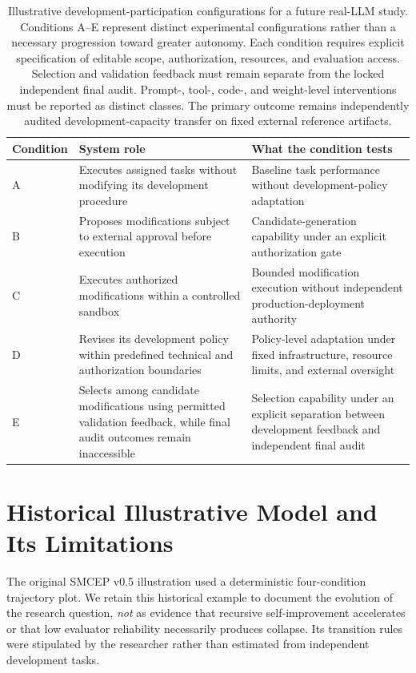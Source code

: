 \documentclass[11pt,a4paper]{article}
\begin{document}
\begin{table}[htbp]\centering\small
\begin{tabularx}{\linewidth}{@{}l X X@{}}\toprule
Condition & System role & What the condition tests \\\midrule
A & Executes assigned tasks without modifying its development procedure & Baseline task performance without development-policy adaptation \\
B & Proposes modifications subject to external approval before execution & Candidate-generation capability under an explicit authorization gate \\
C & Executes authorized modifications within a controlled sandbox & Bounded modification execution without independent production-deployment authority \\
D & Revises its development policy within predefined technical and authorization boundaries & Policy-level adaptation under fixed infrastructure, resource limits, and external oversight \\
E & Selects among candidate modifications using permitted validation feedback, while final audit outcomes remain inaccessible & Selection capability under an explicit separation between development feedback and independent final audit \\\bottomrule
\end{tabularx}
\caption{Illustrative development-participation configurations for a future real-LLM study. Conditions A--E represent distinct experimental configurations rather than a necessary progression toward greater autonomy. Each condition requires explicit specification of editable scope, authorization, resources, and evaluation access. Selection and validation feedback must remain separate from the locked independent final audit. Prompt-, tool-, code-, and weight-level interventions must be reported as distinct classes. The primary outcome remains independently audited development-capacity transfer on fixed external reference artifacts.}\label{tab:participation}
\end{table}

\section{Historical Illustrative Model and Its Limitations}\label{app:simulation}
The original SMCEP v0.5 illustration used a deterministic four-condition trajectory plot. We retain this historical example to document the evolution of the research question, \emph{not} as evidence that recursive self-improvement accelerates or that low evaluator reliability necessarily produces collapse. Its transition rules were stipulated by the researcher rather than estimated from independent development tasks.
\end{document}
